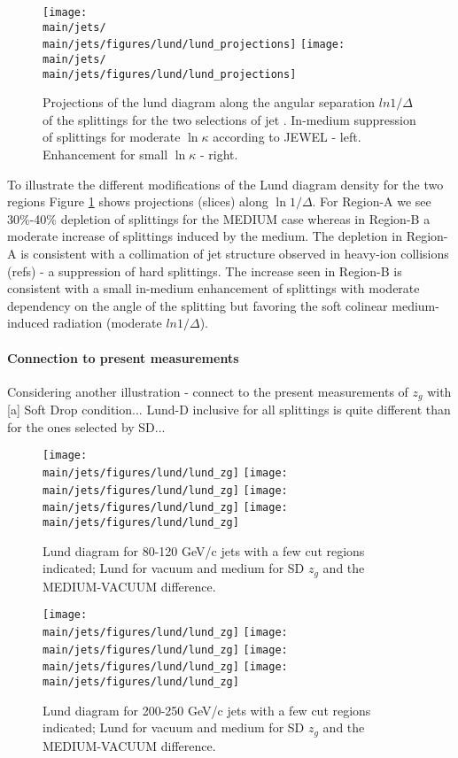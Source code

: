 \begin{figure}[htbp]
	\centering
	\texttt{[image: \\main/jets/\\main/jets/figures/lund/lund\_projections]}
	\texttt{[image: \\main/jets/\\main/jets/figures/lund/lund\_projections]}
	\caption{Projections of the lund diagram along the angular separation $ln 1/\Delta$ of the splittings for the two selections of jet \pt. In-medium suppression of splittings for moderate $\ln{\kappa}$ according to JEWEL - left. Enhancement for small $\ln{\kappa}$ - right.}
	\label{fig:Lund_projections}
\end{figure}

To illustrate the different modifications of the Lund diagram density for the two regions Figure \ref{fig:Lund_projections} shows projections (slices) along $\ln 1/\Delta$. For Region-A we see 30\%-40\% depletion of splittings for the MEDIUM case whereas in Region-B a moderate increase of splittings induced by the medium. The depletion in Region-A is consistent with a collimation of jet structure observed in heavy-ion collisions (refs) - a suppression of hard splittings. The increase seen in Region-B is consistent with a small in-medium enhancement of splittings with moderate dependency on the angle of the splitting but favoring the soft colinear medium-induced radiation (moderate $ln 1/\Delta$).

\paragraph{Connection to present measurements}

Considering another illustration - connect to the present measurements of $z_{g}$ with [a] Soft Drop condition... Lund-D inclusive for all splittings is quite different than for the ones selected by SD...

\begin{figure}[htbp]
	\centering
	\texttt{[image: \\main/jets/figures/lund/lund\_zg]}
	\texttt{[image: \\main/jets/figures/lund/lund\_zg]}
	\texttt{[image: \\main/jets/figures/lund/lund\_zg]}
	\texttt{[image: \\main/jets/figures/lund/lund\_zg]}
	\caption{Lund diagram for 80-120 GeV/c jets with a few cut regions indicated; Lund for vacuum and medium for SD $z_{g}$ and the MEDIUM-VACUUM difference.}
	\label{fig:Lund_zg_lowpt}
\end{figure}

\begin{figure}[htbp]
	\centering
	\texttt{[image: \\main/jets/figures/lund/lund\_zg]}
	\texttt{[image: \\main/jets/figures/lund/lund\_zg]}
	\texttt{[image: \\main/jets/figures/lund/lund\_zg]}
	\texttt{[image: \\main/jets/figures/lund/lund\_zg]}
	\caption{Lund diagram for 200-250 GeV/c jets with a few cut regions indicated; Lund for vacuum and medium for SD $z_{g}$ and the MEDIUM-VACUUM difference.}
	\label{fig:Lund_zg_highpt}
\end{figure}

